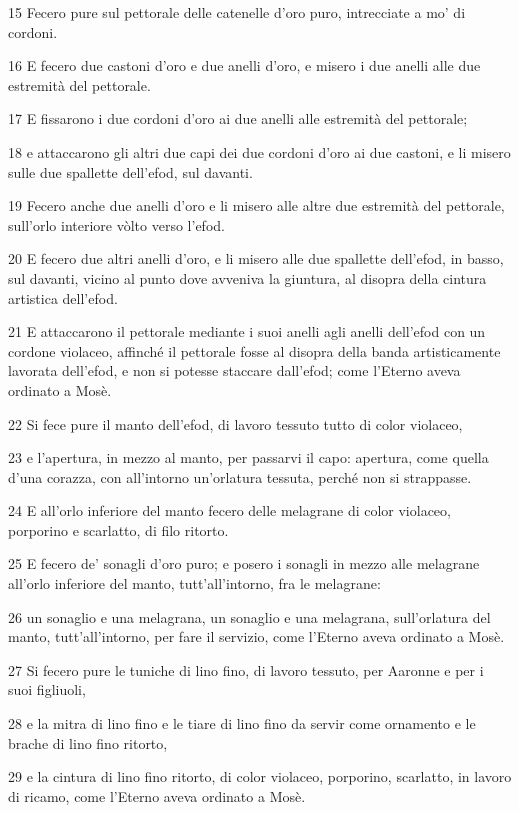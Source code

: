 \par 15 Fecero pure sul pettorale delle catenelle d'oro puro, intrecciate a mo' di cordoni.
\par 16 E fecero due castoni d'oro e due anelli d'oro, e misero i due anelli alle due estremità del pettorale.
\par 17 E fissarono i due cordoni d'oro ai due anelli alle estremità del pettorale;
\par 18 e attaccarono gli altri due capi dei due cordoni d'oro ai due castoni, e li misero sulle due spallette dell'efod, sul davanti.
\par 19 Fecero anche due anelli d'oro e li misero alle altre due estremità del pettorale, sull'orlo interiore vòlto verso l'efod.
\par 20 E fecero due altri anelli d'oro, e li misero alle due spallette dell'efod, in basso, sul davanti, vicino al punto dove avveniva la giuntura, al disopra della cintura artistica dell'efod.
\par 21 E attaccarono il pettorale mediante i suoi anelli agli anelli dell'efod con un cordone violaceo, affinché il pettorale fosse al disopra della banda artisticamente lavorata dell'efod, e non si potesse staccare dall'efod; come l'Eterno aveva ordinato a Mosè.
\par 22 Si fece pure il manto dell'efod, di lavoro tessuto tutto di color violaceo,
\par 23 e l'apertura, in mezzo al manto, per passarvi il capo: apertura, come quella d'una corazza, con all'intorno un'orlatura tessuta, perché non si strappasse.
\par 24 E all'orlo inferiore del manto fecero delle melagrane di color violaceo, porporino e scarlatto, di filo ritorto.
\par 25 E fecero de' sonagli d'oro puro; e posero i sonagli in mezzo alle melagrane all'orlo inferiore del manto, tutt'all'intorno, fra le melagrane:
\par 26 un sonaglio e una melagrana, un sonaglio e una melagrana, sull'orlatura del manto, tutt'all'intorno, per fare il servizio, come l'Eterno aveva ordinato a Mosè.
\par 27 Si fecero pure le tuniche di lino fino, di lavoro tessuto, per Aaronne e per i suoi figliuoli,
\par 28 e la mitra di lino fino e le tiare di lino fino da servir come ornamento e le brache di lino fino ritorto,
\par 29 e la cintura di lino fino ritorto, di color violaceo, porporino, scarlatto, in lavoro di ricamo, come l'Eterno aveva ordinato a Mosè.
